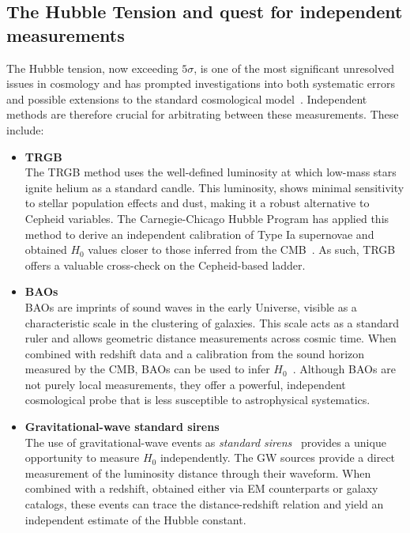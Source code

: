 \subsection{The Hubble Tension and quest for independent measurements}
The Hubble tension, now exceeding $5\sigma$, is one of the most significant unresolved issues in cosmology and has prompted investigations into both systematic errors and possible extensions to the standard cosmological model~\citep{annurev:tension}.
Independent methods are therefore crucial for arbitrating between these measurements. These include:
\vspace{-1em}
\begin{itemize}
    \item \textbf{\ac{TRGB}}\\
    The \ac{TRGB} method uses the well-defined luminosity at which low-mass stars ignite helium as a standard candle. This luminosity, shows minimal sensitivity to stellar population effects and dust, making it a robust alternative to Cepheid variables. The Carnegie-Chicago Hubble Program has applied this method to derive an independent calibration of Type Ia supernovae and obtained $H_0$ values closer to those inferred from the CMB~\citep{freedman2024status}. As such, \ac{TRGB} offers a valuable cross-check on the Cepheid-based ladder.
    \vspace{-1em}
    \item \textbf{\acp{BAO}}\\
    \acp{BAO} are imprints of sound waves in the early Universe, visible as a characteristic scale in the clustering of galaxies. This scale acts as a standard ruler and allows geometric distance measurements across cosmic time. When combined with redshift data and a calibration from the sound horizon measured by the \ac{CMB}, \acp{BAO} can be used to infer $H_0$~\citep{cuceu2019baryon,alam2021completed}. Although \acp{BAO} are not purely local measurements, they offer a powerful, independent cosmological probe that is less susceptible to astrophysical systematics.
    \vspace{-1em}
    \item \textbf{Gravitational-wave standard sirens}\\
    The use of gravitational-wave events as \textit{standard sirens}~\citep{schutz1986determining} provides a unique opportunity to measure $H_0$ independently.  The \ac{GW} sources provide a direct measurement of the luminosity distance through their waveform. When combined with a redshift, obtained either via \ac{EM} counterparts or galaxy catalogs, these events can trace the distance-redshift relation and yield an independent estimate of the Hubble constant.


\end{itemize}
